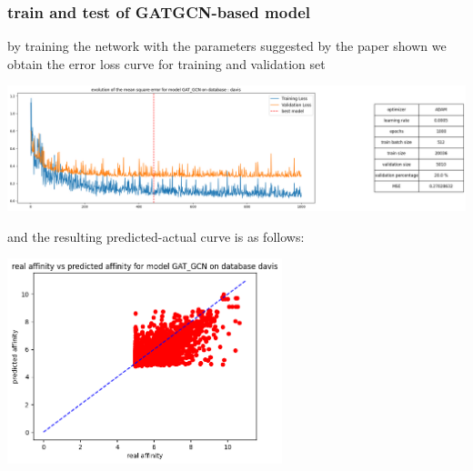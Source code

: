 \documentclass[11pt, a4paper]{article}
\begin{document}
        \subsubsection{train and test of GATGCN-based model}
        by training the network with the parameters suggested by the paper shown we obtain the error loss curve for training and validation set 
        \begin{center}
            \includegraphics[width=1.0\textwidth]{train_test_plots/davis GATGCN train.png}
        \end{center}
        and the resulting predicted-actual curve is as follows:
        \begin{center}
            \includegraphics[width=0.6\textwidth]{train_test_plots/davis GATGCN test.png}
        \end{center}
\end{document}
